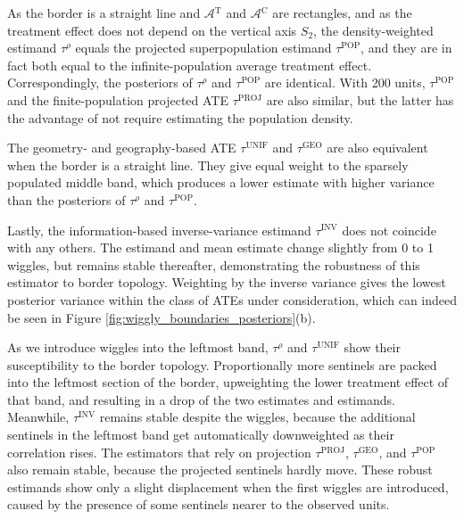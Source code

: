 \documentclass[letter]{article}
\newcommand{\area}{\mathcal{A}}
\newcommand{\treat}{\mathrm{T}}
\newcommand{\ctrol}{\mathrm{C}}
\newcommand{\treatarea}{\area{}^{\treat}}
\newcommand{\ctrolarea}{\area{}^{\ctrol}}
\newcommand{\unifavg}{\tau^{\mathrm{UNIF}}}
\newcommand{\invvar}{\tau^{\mathrm{INV}}}
\newcommand{\taurho}{\tau^{\rho}}
\newcommand{\tauproj}{\tau^{\mathrm{PROJ}}}
\newcommand{\taugeo}{\tau^{\mathrm{GEO}}}
\newcommand{\taupop}{\tau^{\mathrm{POP}}}
\begin{document}
As the border is a straight line and \(\treatarea\) and \(\ctrolarea\) are rectangles,
and as the treatment effect does not depend on the vertical axis \(S_2\),
the density-weighted estimand \(\taurho\) equals the projected superpopulation estimand \(\taupop\),
and they are in fact both equal to the infinite-population average treatment effect.
Correspondingly, the posteriors of \(\taurho\) and \(\taupop\) are identical.
With 200 units, \(\taupop\) and the finite-population projected ATE \(\tauproj\) are also similar, but the latter has the advantage of not require estimating the population density.

The geometry- and geography-based ATE \(\unifavg\) and \(\taugeo\) are also equivalent when the border is a straight line.
They give equal weight to the sparsely populated middle band, which produces a lower estimate with higher variance than the posteriors of \(\taurho\) and \(\taupop\).

Lastly, the information-based inverse-variance estimand \(\invvar\) does not coincide with any others.
The estimand and mean estimate change slightly from 0 to 1 wiggles, but remains stable thereafter, demonstrating the robustness of this estimator to border topology.
Weighting by the inverse variance gives the lowest posterior variance within the class of ATEs under consideration, which can indeed be seen in Figure \ref{fig:wiggly_boundaries_posteriors}(b).

As we introduce wiggles into the leftmost band,
\(\taurho\) and \(\unifavg\) show their susceptibility to the border topology.
Proportionally more sentinels are packed into the leftmost section of the border,
upweighting the lower treatment effect of that band,
and resulting in a drop of the two estimates and estimands.
Meanwhile, \(\invvar\) remains stable despite the wiggles,
because the additional sentinels in the leftmost
band get automatically downweighted as their correlation rises.
The estimators that rely on projection
\(\tauproj\), \(\taugeo\), and \(\taupop\) also remain stable,
because the projected sentinels hardly move.
These robust estimands show only a slight displacement when the first wiggles are introduced,
caused by the presence of some sentinels nearer to the observed units.
    
\end{document}

